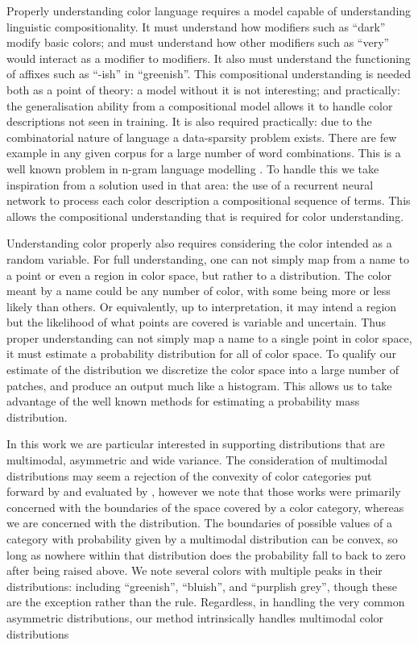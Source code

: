 \documentclass[11pt,letterpaper]{article}
\newcommand{\parencite}{\cite}
\newcommand{\textcite}{\newcite}
\begin{document}
Properly understanding color language requires a model capable of understanding linguistic compositionality.
It must understand how modifiers such as ``dark'' modify basic colors; and must understand how other modifiers such as ``very'' would interact as a modifier to modifiers.
It also must understand the functioning of affixes such as ``-ish'' in ``greenish''.
This compositional understanding is needed both as a point of theory: a model without it is not interesting; and practically: the generalisation ability from a compositional model allows it to handle color descriptions not seen in training.
It is also required practically: due to the combinatorial nature of language a data-sparsity problem exists.
There are few example in any given corpus for a large number of word combinations.
This is a well known problem in n-gram language modelling \parencite{kneser1995improved,chen1996empirical,rosenfeld2000two}.
To handle this we take inspiration from a solution used in that area: the use of a recurrent neural network \parencite{mikolov2010recurrent,mikolov2011RnnLM} to process each color description a compositional sequence of terms.
This allows the compositional understanding that is required for color understanding.

Understanding color properly also requires considering the color intended as a random variable.
For full understanding, one can not simply map from a name to a point or even a region in color space, but rather to a distribution.
The color meant by a name could be any number of color, with some being more or less likely than others.
Or equivalently, up to interpretation, it may intend a region but the likelihood of what points are covered is variable and uncertain.
Thus proper understanding can not simply map a name to a single point in color space, it must estimate a probability distribution for all of color space.
To qualify our estimate of the distribution we discretize the color space into a large number of patches, and produce an output much like a histogram.
This allows us to take advantage of the well known methods for estimating a probability mass distribution.

In this work we are particular interested in supporting distributions that are multimodal, asymmetric and wide variance.
The consideration of multimodal distributions may seem a rejection of the convexity of color categories put forward by \textcite{Gardenfors2000Cs} and evaluated by \textcite{jager2010natural}, however we note that those works were primarily concerned with the boundaries of the space covered by a color category, whereas we are concerned with the distribution.
The boundaries of possible values of a category with probability given by a multimodal distribution can be convex, so long as nowhere within that distribution does the probability fall to back to zero after being raised above. We note several colors with multiple peaks in their distributions: including ``greenish'', ``bluish'', and ``purplish grey'', though these are the exception rather than the rule.
Regardless, in handling the very common asymmetric distributions, our method intrinsically handles multimodal color distributions
\end{document}
